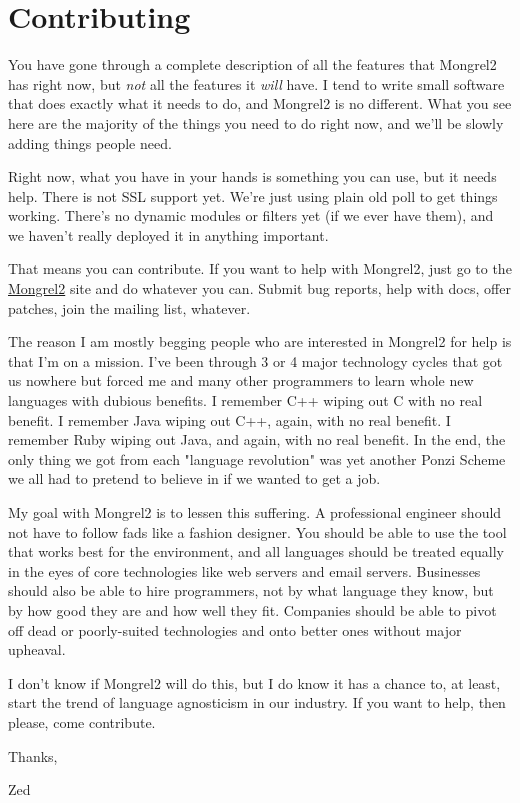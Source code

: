 \chapter{Contributing}

You have gone through a complete description of all the features that Mongrel2 has right now,
but \emph{not} all the features it \emph{will} have.  I tend to write small software that does
exactly what it needs to do, and Mongrel2 is no different.  What you see here are the
majority of the things you need to do right now, and we'll be slowly adding things
people need.

Right now, what you have in your hands is something you can use, but it needs help.
There is not SSL support yet.  We're just using plain old poll to get things working.
There's no dynamic modules or filters yet (if we ever have them), and we haven't
really deployed it in anything important.

That means you can contribute.  If you want to help with Mongrel2, just go to
the \href{http://mongrel2.org}{Mongrel2} site and do whatever you can.  Submit bug
reports, help with docs, offer patches, join the mailing list, whatever.

The reason I am mostly begging people who are interested in Mongrel2 for help is that I'm
on a mission.  I've been through 3 or 4 major technology cycles that got us nowhere
but forced me and many other programmers to learn whole new languages with dubious
benefits.  I remember C++ wiping out C with no real benefit.  I remember Java wiping
out C++, again, with no real benefit.  I remember Ruby wiping out Java, and again, with no
real benefit.  In the end, the only thing we got from each "language revolution" was
yet another Ponzi Scheme we all had to pretend to believe in if we wanted to get a
job.

My goal with Mongrel2 is to lessen this suffering.  A professional engineer should not
have to follow fads like a fashion designer.  You should be able to use the tool that
works best for the environment, and all languages should be treated equally in the eyes
of core technologies like web servers and email servers.  Businesses should also be
able to hire programmers, not by what language they know, but by how good they are and
how well they fit.  Companies should be able to pivot off dead or poorly-suited
technologies and onto better ones without major upheaval.

I don't know if Mongrel2 will do this, but I do know it has a chance to, at least, start
the trend of language agnosticism in our industry.  If you want to help, then please,
come contribute.

Thanks,

\indent Zed
